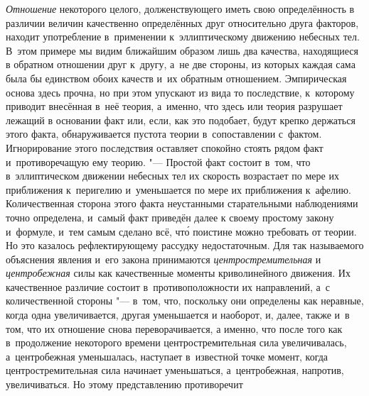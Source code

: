 
{\em Отношение} некоторого целого, долженствующего иметь свою определённость в
различии величин качественно определённых друг относительно друга факторов,
находит употребление в~применении к~эллиптическому движению небесных тел.
В~этом примере мы видим ближайшим образом лишь два качества, находящиеся в
обратном отношении друг к~другу, а~не две стороны, из которых каждая сама была
бы единством обоих качеств и~их обратным отношением. Эмпирическая основа здесь
прочна, но при этом упускают из вида то последствие, к~которому приводит
внесённая в~неё теория, а~именно, что здесь или теория разрушает лежащий в
основании факт или, если, как это подобает, будут крепко держаться этого факта,
обнаруживается пустота теории в~сопоставлении с~фактом. Игнорирование этого
последствия оставляет спокойно стоять рядом факт и~противоречащую ему теорию.
"--- Простой факт состоит в~том, что в~эллиптическом движении небесных тел их
скорость возрастает по мере их приближения к~перигелию и~уменьшается по мере их
приближения к~афелию. Количественная сторона этого факта неустанными
старательными наблюдениями точно определена, и~самый факт приведён далее к
своему простому закону и~формуле, и~тем самым сделано всё, чт\'{о} поистине
можно требовать от теории. Но это казалось рефлектирующему рассудку
недостаточным. Для так называемого объяснения явления и~его закона принимаются
{\em центростремительная} и {\em центробежная} силы как качественные моменты
криволинейного движения. Их качественное различие состоит в~противоположности
их направлений, а~с количественной стороны "--- в~том, что, поскольку они
определены как неравные, когда одна увеличивается, другая уменьшается и
наоборот, и, далее, также и~в том, что их отношение снова переворачивается, а
именно, что после того как в~продолжение некоторого времени центростремительная
сила увеличивалась, а~центробежная уменьшалась, наступает в~известной точке
момент, когда центростремительная сила начинает уменьшаться, а~центробежная,
напротив, увеличиваться. Но этому представлению противоречит
